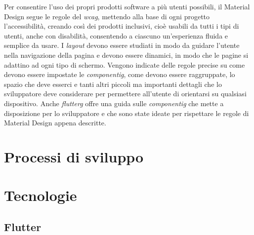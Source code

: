 \newline
Per consentire l'uso dei propri prodotti software a più utenti possibili, il Material Design segue le regole del \emph{\gls{wcag}}\glsfirstoccur, mettendo alla base di ogni progetto l'accessibilità, creando così dei prodotti inclusivi, cioè usabili da tutti i tipi di utenti, anche con disabilità, consentendo a ciascuno un'esperienza fluida e semplice da usare.\newline
\newline
I \emph{layout} devono essere studiati in modo da guidare l'utente nella navigazione della pagina e devono essere dinamici, in modo che le pagine si adattino ad ogni tipo di schermo.\newline
Vengono indicate delle regole precise su come devono essere impostate le \emph{\gls{componentig}}\glsfirstoccur, come devono essere raggruppate, lo spazio che deve esserci e tanti altri piccoli ma importanti dettagli che lo sviluppatore deve considerare per permettere all'utente di orientarsi su qualsiasi dispositivo.\newline
Anche \emph{\gls{flutterg}} offre una guida sulle \emph{\gls{componentig}} che mette a disposizione per lo sviluppatore e che sono state ideate per rispettare le regole di Material Design appena descritte.\newline

\section{Processi di sviluppo}
 
\section{Tecnologie}

\subsection{Flutter}

